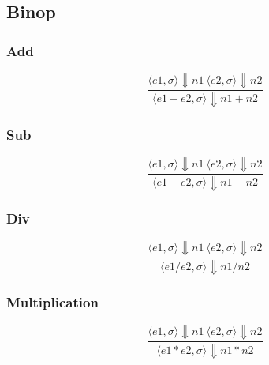 \documentclass[12pt]{article}
\begin{document}
            \subsection{Binop}
                \subsubsection{Add}
                    \begin{equation}  
                        \frac{\langle e1, \sigma \rangle\Downarrow n1 \: \langle e2, \sigma \rangle\Downarrow n2}
                        {\langle e1 + e2, \sigma \rangle\Downarrow n1 + n2}
                    \end{equation}
                    
                \subsubsection{Sub}
                    \begin{equation}  
                        \frac{\langle e1, \sigma \rangle\Downarrow n1 \: \langle e2, \sigma \rangle\Downarrow n2}
                        {\langle e1 - e2, \sigma \rangle\Downarrow n1 - n2}
                    \end{equation}
                    
                \subsubsection{Div}
                    \begin{equation}  
                        \frac{\langle e1, \sigma \rangle\Downarrow n1 \: \langle e2, \sigma \rangle\Downarrow n2}
                        {\langle e1 / e2, \sigma \rangle\Downarrow n1 / n2}
                    \end{equation}
                    
                \subsubsection{Multiplication}
                    \begin{equation}  
                        \frac{\langle e1, \sigma \rangle\Downarrow n1 \: \langle e2, \sigma \rangle\Downarrow n2}
                        {\langle e1 * e2, \sigma \rangle\Downarrow n1 * n2}
                    \end{equation}
                
\end{document}

